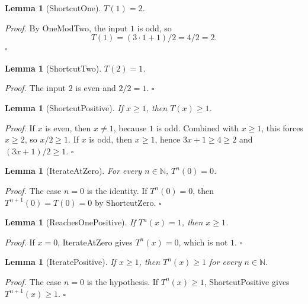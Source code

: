 \documentclass[11pt,letterpaper]{article}
\newcommand{\N}{\mathbb{N}}
\newtheorem{lemma}[theorem]{Lemma}
\newenvironment{proof}{\noindent\textit{Proof.}}{\hfill\(\square\)}
\begin{document}
\begin{lemma}[ShortcutOne]
\(T(1)=2\).
\end{lemma}

\begin{proof}
By OneModTwo, the input \(1\) is odd, so
\[
  T(1)=(3\cdot 1+1)/2=4/2=2.
\]
\end{proof}

\begin{lemma}[ShortcutTwo]
\(T(2)=1\).
\end{lemma}

\begin{proof}
The input \(2\) is even and \(2/2=1\).
\end{proof}

\begin{lemma}[ShortcutPositive]
If \(x\ge 1\), then \(T(x)\ge 1\).
\end{lemma}

\begin{proof}
If \(x\) is even, then \(x\neq 1\), because \(1\) is odd. Combined with \(x\ge 1\), this forces \(x\ge 2\), so \(x/2\ge 1\). If \(x\) is odd, then \(x\ge 1\), hence \(3x+1\ge 4\ge 2\) and \((3x+1)/2\ge 1\).
\end{proof}

\begin{lemma}[IterateAtZero]
For every \(n\in\N\), \(T^{n}(0)=0\).
\end{lemma}

\begin{proof}
The case \(n=0\) is the identity. If \(T^{n}(0)=0\), then \(T^{n+1}(0)=T(0)=0\) by ShortcutZero.
\end{proof}

\begin{lemma}[ReachesOnePositive]
If \(T^{n}(x)=1\), then \(x\ge 1\).
\end{lemma}

\begin{proof}
If \(x=0\), IterateAtZero gives \(T^{n}(x)=0\), which is not \(1\).
\end{proof}

\begin{lemma}[IteratePositive]
If \(x\ge 1\), then \(T^{n}(x)\ge 1\) for every \(n\in\N\).
\end{lemma}

\begin{proof}
The case \(n=0\) is the hypothesis. If \(T^{n}(x)\ge 1\), ShortcutPositive gives \(T^{n+1}(x)\ge 1\).
\end{proof}
\end{document}
